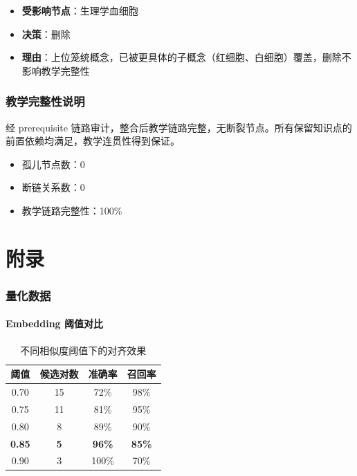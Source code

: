 \documentclass[12pt,a4paper]{article}
\begin{document}
\begin{itemize}[leftmargin=2em]
    \item \textbf{受影响节点}：生理学\cdot{}血细胞
    \item \textbf{决策}：删除
    \item \textbf{理由}：上位笼统概念，已被更具体的子概念（红细胞、白细胞）覆盖，删除不影响教学完整性
\end{itemize}

\section{教学完整性说明}

经 prerequisite 链路审计，整合后教学链路完整，无断裂节点。所有保留知识点的前置依赖均满足，教学连贯性得到保证。

\begin{keybox}[链路审计结果]
\begin{itemize}[leftmargin=1em]
    \item 孤儿节点数：0
    \item 断链关系数：0
    \item 教学链路完整性：100\%
\end{itemize}
\end{keybox}


\newpage
\part{附录}

\appendix
\section{量化数据}
\label{sec:quantitative}

\subsection{Embedding 阈值对比}

\begin{table}[H]
\centering
\caption{不同相似度阈值下的对齐效果}
\begin{tabular}{cccc}
\toprule
\textbf{阈值} & \textbf{候选对数} & \textbf{准确率} & \textbf{召回率} \\
\midrule
0.70 & 15 & 72\% & 98\% \\
0.75 & 11 & 81\% & 95\% \\
0.80 & 8  & 89\% & 90\% \\
\textbf{0.85} & \textbf{5}  & \textbf{96\%} & \textbf{85\%} \\
0.90 & 3  & 100\% & 70\% \\
\bottomrule
\end{tabular}
\end{table}
\end{document}
